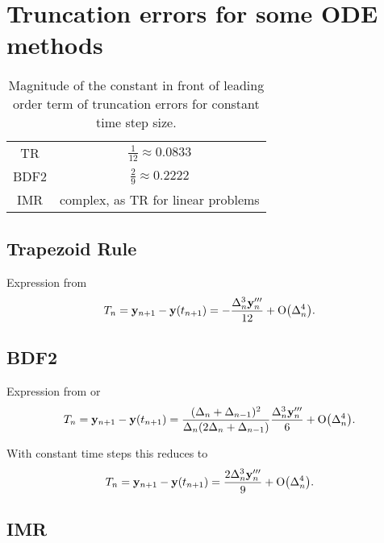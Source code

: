 \chapter{Truncation errors for some ODE methods}
\label{cha:trunc-errors}

\begin{table}[h]
  \centering
  \begin{tabular}{c|c}
    TR & $\frac{1}{12} \approx 0.0833$ \\
    BDF2 & $\frac{2}{9} \approx 0.2222$ \\
    IMR & complex, as TR for linear problems
  \end{tabular}
  \caption{Magnitude of the constant in front of leading order term of truncation errors for constant time step size.}
  \label{tab:truncation-errors}
\end{table}

\section{Trapezoid Rule}

Expression from \cite[261]{GreshoSani}
\begin{equation}
  \label{eq:tr-lte-conststep}
  T_n = \mathbf{y}_{n+1} - \mathbf{y}(t_{n+1}) = -\frac{\Delta_{n}^3 \mathbf{y}_n'''}{12}
  + \text{O}{\left( \Delta_{n}^4 \right)}.
\end{equation}

\section{BDF2}

Expression from \cite[715]{GreshoSani} or \cite[eq. (2.43)]{Prinja2010}
\begin{equation}
  \label{eq:bdf2-lte-appendix}
  T_n = \mathbf{y}_{n+1} - \mathbf{y}(t_{n+1}) = \frac{(\Delta_{n} + \Delta_{n-1})^2}{\Delta_{n}(2\Delta_{n} + \Delta_{n-1})}
  \frac{\Delta_{n}^3 \mathbf{y}_n'''}{6}
  + \text{O}{\left( \Delta_{n}^4 \right)}.
\end{equation}

With constant time steps this reduces to
\begin{equation}
  \label{eq:bdf2-lte}
  T_n = \mathbf{y}_{n+1} - \mathbf{y}(t_{n+1}) =  \frac{2\Delta_{n}^3 \mathbf{y}_n'''}{9}
  + \text{O}{\left( \Delta_{n}^4 \right)}.
\end{equation}

\section{IMR}
\label{sec:full-imr-lte-calculation}

